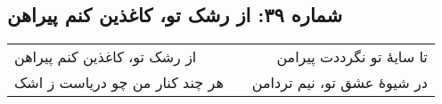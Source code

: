 \begin{center}
\section*{شماره ۳۹: از رشک تو، کاغذین کنم پیراهن}
\label{sec:039}
\begin{longtable}{l p{0.5cm} r}
از رشک تو، کاغذین کنم پیراهن
&&
تا سایهٔ تو نگرددت پیرامن
\\
هر چند کنار من چو دریاست ز اشک
&&
در شیوهٔ عشق تو، نیم تردامن
\\
\end{longtable}
\end{center}
